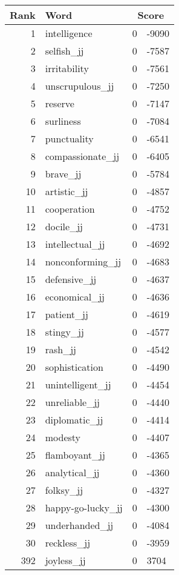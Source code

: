 \begin{longtable}[!htbp]{| rlr@{.}l |}
    \hline
    \textbf{Rank} & \textbf{Word} & \multicolumn{2}{c|}{\textbf{Score}} \\
    \hline
    \endhead
    1 & intelligence & 0 & -9090 \\
    2 & selfish\_jj & 0 & -7587 \\
    3 & irritability & 0 & -7561 \\
    4 & unscrupulous\_jj & 0 & -7250 \\
    5 & reserve & 0 & -7147 \\
    6 & surliness & 0 & -7084 \\
    7 & punctuality & 0 & -6541 \\
    8 & compassionate\_jj & 0 & -6405 \\
    9 & brave\_jj & 0 & -5784 \\
    10 & artistic\_jj & 0 & -4857 \\
    11 & cooperation & 0 & -4752 \\
    12 & docile\_jj & 0 & -4731 \\
    13 & intellectual\_jj & 0 & -4692 \\
    14 & nonconforming\_jj & 0 & -4683 \\
    15 & defensive\_jj & 0 & -4637 \\
    16 & economical\_jj & 0 & -4636 \\
    17 & patient\_jj & 0 & -4619 \\
    18 & stingy\_jj & 0 & -4577 \\
    19 & rash\_jj & 0 & -4542 \\
    20 & sophistication & 0 & -4490 \\
    21 & unintelligent\_jj & 0 & -4454 \\
    22 & unreliable\_jj & 0 & -4440 \\
    23 & diplomatic\_jj & 0 & -4414 \\
    24 & modesty & 0 & -4407 \\
    25 & flamboyant\_jj & 0 & -4365 \\
    26 & analytical\_jj & 0 & -4360 \\
    27 & folksy\_jj & 0 & -4327 \\
    28 & happy-go-lucky\_jj & 0 & -4300 \\
    29 & underhanded\_jj & 0 & -4084 \\
    30 & reckless\_jj & 0 & -3959 \\
    392 & joyless\_jj & 0 & 3704 \\

\end{longtable}
